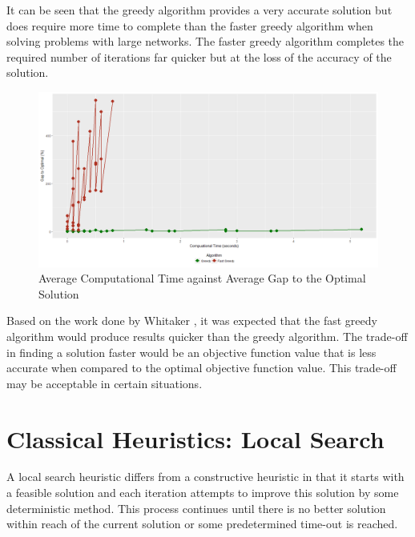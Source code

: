\documentclass[11pt]{article}
\begin{document}
	It can be seen that the greedy algorithm provides a very accurate solution but does require more time to complete than the faster greedy algorithm when solving problems with large networks.  The faster greedy algorithm completes the required number of iterations far quicker but at the loss of the accuracy of the solution.
	
	\begin{figure}[H]
		\begin{center}
			\includegraphics[width=14cm]{CHtimevacc2.png}
			\caption{Average Computational Time against Average Gap to the Optimal Solution}
			\label{CHtimevacc2}
		\end{center}
	\end{figure}
	
	

	Based on the work done by Whitaker \cite{WHIT83}, it was expected that the fast greedy algorithm would produce results quicker than the greedy algorithm.  The trade-off in finding a solution faster would be an objective function value that is less accurate when compared to the optimal objective function value.  This trade-off may be acceptable in certain situations.
	
	
	\section{Classical Heuristics: Local Search} \label{classicheuristics.localsearch}
	A local search heuristic differs from a constructive heuristic in that it starts with a feasible solution and each iteration attempts to improve this solution by some deterministic method.  This process continues until there is no better solution within reach of the current solution or some predetermined time-out is reached.
	
\end{document}

